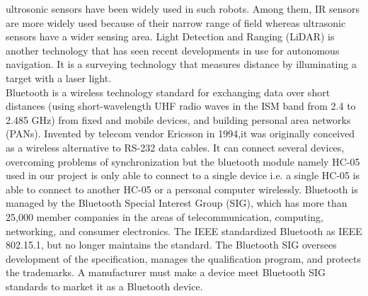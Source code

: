 ultrosonic sensors have been widely used in such robots. Among them, IR sensors are more widely
used because of their narrow range of field whereas ultrasonic sensors have a wider sensing area. Light
Detection and Ranging (LiDAR) is another technology that has seen recent developments in use for
autonomous navigation. It is a surveying technology that measures distance by illuminating a target
with a laser light.\\
Bluetooth is a wireless technology standard for exchanging data over short distances (using
short-wavelength UHF radio waves in the ISM band from 2.4 to 2.485 GHz) from fixed and
mobile devices, and building personal area networks (PANs). Invented by telecom vendor
Ericsson in 1994,it was originally conceived as a wireless alternative to RS-232 data cables.
It can connect several devices, overcoming problems of synchronization but the bluetooth
module namely HC-05 used in our project is only able to connect to a single device i.e. a
single HC-05 is able to connect to another HC-05 or a personal computer wirelessly.
Bluetooth is managed by the Bluetooth Special Interest Group (SIG), which has more than
25,000 member companies in the areas of telecommunication, computing, networking, and
consumer electronics. The IEEE standardized Bluetooth as IEEE 802.15.1, but no longer
maintains the standard. The Bluetooth SIG oversees development of the specification, manages the qualification program, and protects the trademarks. A manufacturer must make a
device meet Bluetooth SIG standards to market it as a Bluetooth device.